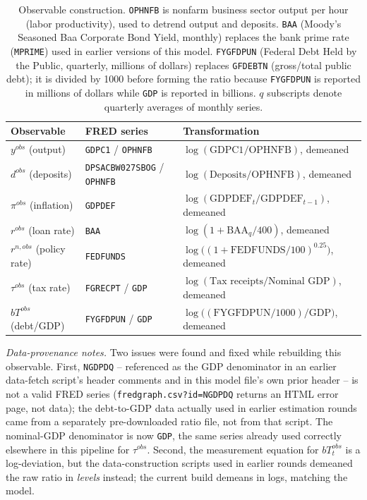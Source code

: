 \documentclass[11pt]{article}
\begin{document}
\begin{table}[h]
\centering
\small
\begin{tabular}{@{}lll@{}}
\toprule
Observable & FRED series & Transformation \\
\midrule
$y^{obs}$ (output) & \texttt{GDPC1} / \texttt{OPHNFB} &
  $\log(\text{GDPC1}/\text{OPHNFB})$, demeaned \\
$d^{obs}$ (deposits) & \texttt{DPSACBW027SBOG} / \texttt{OPHNFB} &
  $\log(\text{Deposits}/\text{OPHNFB})$, demeaned \\
$\pi^{obs}$ (inflation) & \texttt{GDPDEF} &
  $\log(\text{GDPDEF}_t/\text{GDPDEF}_{t-1})$, demeaned \\
$r^{obs}$ (loan rate) & \texttt{BAA} &
  $\log(1+\text{BAA}_q/400)$, demeaned \\
$r^{n,obs}$ (policy rate) & \texttt{FEDFUNDS} &
  $\log\!\big((1+\text{FEDFUNDS}/100)^{0.25}\big)$, demeaned \\
$\tau^{obs}$ (tax rate) & \texttt{FGRECPT} / \texttt{GDP} &
  $\log(\text{Tax receipts}/\text{Nominal GDP})$, demeaned \\
$bT^{obs}$ (debt/GDP) & \texttt{FYGFDPUN} / \texttt{GDP} &
  $\log\big((\text{FYGFDPUN}/1000)/\text{GDP}\big)$, demeaned \\
\bottomrule
\end{tabular}
\caption{Observable construction. \texttt{OPHNFB} is nonfarm business
sector output per hour (labor productivity), used to detrend output and
deposits. \texttt{BAA} (Moody's Seasoned Baa Corporate Bond Yield,
monthly) replaces the bank prime rate (\texttt{MPRIME}) used in earlier
versions of this model. \texttt{FYGFDPUN} (Federal Debt Held by the
Public, quarterly, millions of dollars) replaces \texttt{GFDEBTN}
(gross/total public debt); it is divided by 1000 before forming the
ratio because \texttt{FYGFDPUN} is reported in millions of dollars while
\texttt{GDP} is reported in billions. $q$ subscripts denote quarterly
averages of monthly series.}
\label{tab:data}
\end{table}

\emph{Data-provenance notes.} Two issues were found and fixed while
rebuilding this observable. First, \texttt{NGDPDQ} -- referenced as the
GDP denominator in an earlier data-fetch script's header comments and in
this model file's own prior header -- is not a valid FRED series
(\texttt{fredgraph.csv?id=NGDPDQ} returns an HTML error page, not data);
the debt-to-GDP data actually used in earlier estimation rounds came
from a separately pre-downloaded ratio file, not from that script. The
nominal-GDP denominator is now \texttt{GDP}, the same series already
used correctly elsewhere in this pipeline for $\tau^{obs}$. Second, the
measurement equation for $bT^{obs}_t$ is a log-deviation, but the
data-construction scripts used in earlier rounds demeaned the raw ratio
in \emph{levels} instead; the current build demeans in logs, matching
the model.
\end{document}

